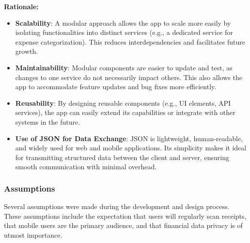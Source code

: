 \documentclass[12pt]{article}
\begin{document}
\noindent\textbf{Rationale:}
\begin{itemize}
    \item \textbf{Scalability}: A modular approach allows the app to scale more easily by isolating functionalities into distinct services (e.g., a dedicated service for expense categorization). This reduces interdependencies and facilitates future growth.
    \item \textbf{Maintainability}: Modular components are easier to update and test, as changes to one service do not necessarily impact others. This also allows the app to accommodate feature updates and bug fixes more efficiently.
    \item \textbf{Reusability}: By designing reusable components (e.g., UI elements, API services), the app can easily extend its capabilities or integrate with other systems in the future.
    \item \textbf{Use of JSON for Data Exchange}: JSON is lightweight, human-readable, and widely used for web and mobile applications. Its simplicity makes it ideal for transmitting structured data between the client and server, ensuring smooth communication with minimal overhead.
\end{itemize}

\subsubsection{Assumptions}
Several assumptions were made during the development and design process. These assumptions include the expectation that users will regularly scan receipts, that mobile users are the primary audience, and that financial data privacy is of utmost importance.\\
\end{document}
